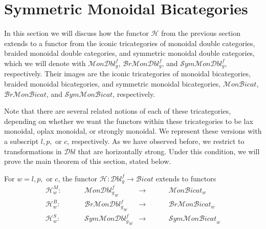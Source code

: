 \section{Symmetric Monoidal Bicategories}
\label{sec:constr-symm-mono}

In this section we will discuss how the functor $\mathcal{H}$ from the previous section extends to a functor from the iconic tricategories of monoidal double categories, braided monoidal double categories, and symmetric monoidal double categories, which we will denote with ${\mathcal{M}on\mathcal{D}bl^f_g}$, ${\mathcal{B}r\mathcal{M}on\mathcal{D}bl^f_g}$, and ${\mathcal{S}ym\mathcal{M}on\mathcal{D}bl^f_g}$, respectively. Their images are the iconic tricategories  of monoidal bicategories, braided monoidal bicategories, and symmetric monoidal bicategories, $\mathcal{M}on\mathcal{B}icat$, $\mathcal{B}r\mathcal{M}on\mathcal{B}icat$, and $\mathcal{S}ym\mathcal{M}on\mathcal{B}icat$, respectively.

Note that there are several related notions of each of these tricategories, depending on whether we want the functors within these tricategories to be lax monoidal, oplax monoidal, or strongly monoidal. We represent these versions with a subscript $ l,p,$ or $c$, respectively. 
As we have observed before, we restrict to transformations in $\mathcal{D}bl$ that are horizontally strong. Under this condition, we will prove the main theorem of this section, stated below. %

\begin{thm}\label{thm:trifunctor2}
For $w=l,p,$ or $c$, the functor $\mathcal{H}: \mathcal{D}bl^f_g \rightarrow \mathcal{B}icat$ extends to functors 
\begin{align}
\mathcal{H}^M_w: \hspace{1cm} &{\mathcal{M}on\mathcal{D}bl^f_g}_w &\rightarrow \hspace{1cm} &{\mathcal{M}on\mathcal{B}icat}_w\\
\mathcal{H}^{B}_w: \hspace{1cm} &{\mathcal{B}r\mathcal{M}on \mathcal{D}bl^f_g}_w &\rightarrow \hspace{1cm} &{\mathcal{B}r\mathcal{M}on\mathcal{B}icat}_w\\ 
 \mathcal{H}^{S}_w: \hspace{1cm} &{\mathcal{S}ym\mathcal{M}on\mathcal{D}bl^f_g}_w &\rightarrow \hspace{1cm} &{\mathcal{S}ym \mathcal{M}on\mathcal{B}icat}_w
\end{align} 
\end{thm}


